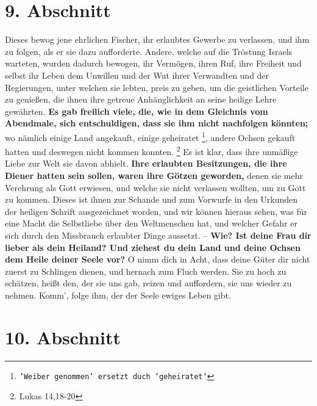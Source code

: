 \section{9. Abschnitt} \label{kap4_ab9}

\label{ref:04_09_besitz}
Dieses bewog jene ehrlichen Fischer, ihr erlaubtes Gewerbe zu verlassen, und ihm
zu folgen, als er sie dazu aufforderte. Andere, welche auf die Tröstung Israels
warteten, wurden dadurch bewogen, ihr Vermögen, ihren Ruf, ihre Freiheit und
selbst ihr Leben dem Unwillen und der Wut ihrer Verwandten und der
Regierungen, unter welchen sie lebten, preis zu geben, um die geistlichen
Vorteile zu genießen, die ihnen ihre getreue Anhänglichkeit an seine heilige
Lehre gewährten. \textbf{Es gab freilich viele, die, wie in dem Gleichnis vom
Abendmale, sich entschuldigen, dass sie ihm nicht nachfolgen könnten;} wo
nämlich
einige Land angekauft, einige geheiratet \footnote{\texttt{'Weiber genommen' ersetzt
duch 'geheiratet'}}, andere Ochsen gekauft hatten und
deswegen nicht kommen konnten.
\footnote{Lukas  14,18-20}
Es ist klar, dass ihre
unmäßige Liebe zur Welt sie davon abhielt. \textbf{Ihre erlaubten Besitzungen,
die ihre
Diener hatten sein sollen, waren ihre Götzen  geworden,} denen sie
mehr Verehrung
als Gott erwiesen, und welche sie nicht verlassen wollten, um zu Gott zu kommen.
Dieses ist ihnen zur Schande und zum Vorwurfe in den Urkunden der heiligen
Schrift ausgezeichnet worden, und wir können hieraus sehen, was für eine Macht
die Selbstliebe über den Weltmenschen hat, und welcher Gefahr er sich durch den
Missbrauch erlaubter Dinge aussetzt. -- \textbf{Wie? Ist deine Frau dir lieber
als dein
Heiland? Und ziehest du dein Land und deine Ochsen dem Heile deiner Seele vor?}
O
nimm dich in Acht, dass deine Güter dir nicht zuerst zu Schlingen dienen, und
hernach zum Fluch werden. Sie zu hoch zu schätzen, heißt den, der sie uns gab,
reizen und auffordern, sie uns wieder zu nehmen. Komm', folge ihm, der der Seele
ewiges Leben gibt.

\section{10. Abschnitt} \label{kap4_ab10}

